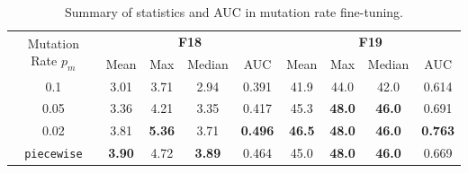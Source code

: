 \documentclass{article}
\begin{document}
\begin{table}[!ht]
    \centering
    \caption{Summary of statistics and AUC in mutation rate fine-tuning.}
    \label{tab:experi-ga-mrate}
    \begin{tabular}{ccccccccc}
        \toprule
        \multirow{2}[3]{*}{Mutation Rate $p_m$} &
        \multicolumn{4}{c}{\textbf{F18}} &
        \multicolumn{4}{c}{\textbf{F19}}\\
        \cmidrule(lr){2-5}
        \cmidrule(lr){6-9}
        & Mean & Max & Median & AUC & Mean & Max & Median & AUC\\
        \midrule
        0.1  & 3.01 & 3.71 & 2.94 & 0.391 & 41.9 & 44.0 & 42.0 & 0.614\\
        0.05 & 3.36 & 4.21 & 3.35 & 0.417 & 45.3 & \textbf{48.0} & \textbf{46.0} & 0.691\\
        0.02 & 3.81 & \textbf{5.36} & 3.71 & \textbf{0.496} & \textbf{46.5} & \textbf{48.0} & \textbf{46.0} & \textbf{0.763}\\
        \texttt{piecewise} & \textbf{3.90} & 4.72 & \textbf{3.89} & 0.464 & 45.0 & \textbf{48.0} & \textbf{46.0} & 0.669\\
        \bottomrule
    \end{tabular}
\end{table}
\end{document}
